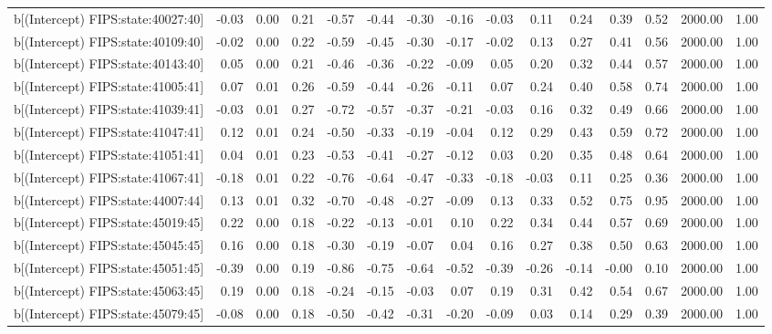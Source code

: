 \begin{table}[ht]
\begin{tabular}{rrrrrrrrrrrrrrr}
  b[(Intercept) FIPS:state:40027:40] & -0.03 & 0.00 & 0.21 & -0.57 & -0.44 & -0.30 & -0.16 & -0.03 & 0.11 & 0.24 & 0.39 & 0.52 & 2000.00 & 1.00 \\ 
  b[(Intercept) FIPS:state:40109:40] & -0.02 & 0.00 & 0.22 & -0.59 & -0.45 & -0.30 & -0.17 & -0.02 & 0.13 & 0.27 & 0.41 & 0.56 & 2000.00 & 1.00 \\ 
  b[(Intercept) FIPS:state:40143:40] & 0.05 & 0.00 & 0.21 & -0.46 & -0.36 & -0.22 & -0.09 & 0.05 & 0.20 & 0.32 & 0.44 & 0.57 & 2000.00 & 1.00 \\ 
  b[(Intercept) FIPS:state:41005:41] & 0.07 & 0.01 & 0.26 & -0.59 & -0.44 & -0.26 & -0.11 & 0.07 & 0.24 & 0.40 & 0.58 & 0.74 & 2000.00 & 1.00 \\ 
  b[(Intercept) FIPS:state:41039:41] & -0.03 & 0.01 & 0.27 & -0.72 & -0.57 & -0.37 & -0.21 & -0.03 & 0.16 & 0.32 & 0.49 & 0.66 & 2000.00 & 1.00 \\ 
  b[(Intercept) FIPS:state:41047:41] & 0.12 & 0.01 & 0.24 & -0.50 & -0.33 & -0.19 & -0.04 & 0.12 & 0.29 & 0.43 & 0.59 & 0.72 & 2000.00 & 1.00 \\ 
  b[(Intercept) FIPS:state:41051:41] & 0.04 & 0.01 & 0.23 & -0.53 & -0.41 & -0.27 & -0.12 & 0.03 & 0.20 & 0.35 & 0.48 & 0.64 & 2000.00 & 1.00 \\ 
  b[(Intercept) FIPS:state:41067:41] & -0.18 & 0.01 & 0.22 & -0.76 & -0.64 & -0.47 & -0.33 & -0.18 & -0.03 & 0.11 & 0.25 & 0.36 & 2000.00 & 1.00 \\ 
  b[(Intercept) FIPS:state:44007:44] & 0.13 & 0.01 & 0.32 & -0.70 & -0.48 & -0.27 & -0.09 & 0.13 & 0.33 & 0.52 & 0.75 & 0.95 & 2000.00 & 1.00 \\ 
  b[(Intercept) FIPS:state:45019:45] & 0.22 & 0.00 & 0.18 & -0.22 & -0.13 & -0.01 & 0.10 & 0.22 & 0.34 & 0.44 & 0.57 & 0.69 & 2000.00 & 1.00 \\ 
  b[(Intercept) FIPS:state:45045:45] & 0.16 & 0.00 & 0.18 & -0.30 & -0.19 & -0.07 & 0.04 & 0.16 & 0.27 & 0.38 & 0.50 & 0.63 & 2000.00 & 1.00 \\ 
  b[(Intercept) FIPS:state:45051:45] & -0.39 & 0.00 & 0.19 & -0.86 & -0.75 & -0.64 & -0.52 & -0.39 & -0.26 & -0.14 & -0.00 & 0.10 & 2000.00 & 1.00 \\ 
  b[(Intercept) FIPS:state:45063:45] & 0.19 & 0.00 & 0.18 & -0.24 & -0.15 & -0.03 & 0.07 & 0.19 & 0.31 & 0.42 & 0.54 & 0.67 & 2000.00 & 1.00 \\ 
  b[(Intercept) FIPS:state:45079:45] & -0.08 & 0.00 & 0.18 & -0.50 & -0.42 & -0.31 & -0.20 & -0.09 & 0.03 & 0.14 & 0.29 & 0.39 & 2000.00 & 1.00 \\ 

\end{tabular}
\end{table}
